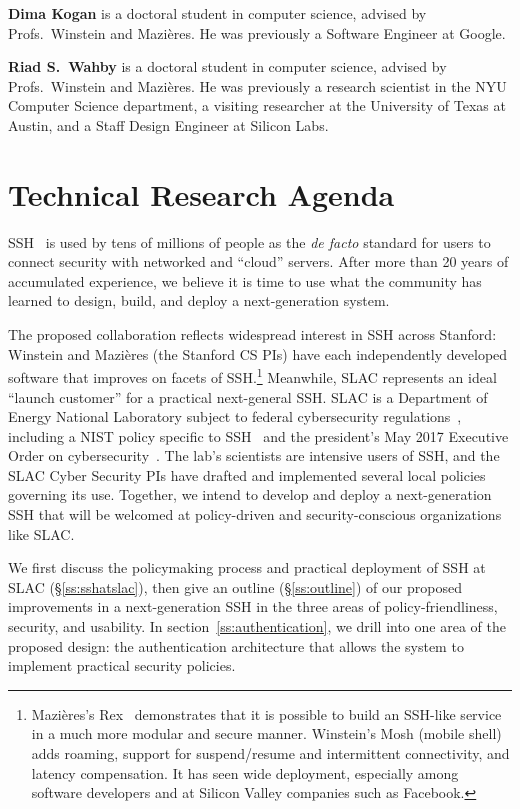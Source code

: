 \documentclass[10pt]{article}
\newcommand{\slim}{\vspace{0.5\baselineskip}}
\begin{document}
\noindent \textbf{Dima Kogan} is a doctoral student in computer science,
advised by Profs.~Winstein and Mazi\`{e}res. He was previously a Software
Engineer at Google.

\slim

\noindent \textbf{Riad S.~Wahby} is a doctoral student in computer science,
advised by Profs.~Winstein and Mazi\`{e}res. He was previously a
research scientist in the NYU Computer Science department, a
visiting researcher at the University of Texas at Austin, and a Staff
Design Engineer at Silicon Labs.

\section{Technical Research Agenda}

SSH~\cite{SSH} is used by tens of millions of people as the \emph{de
  facto} standard for users to connect security with networked and
``cloud'' servers. After more than 20 years of accumulated experience,
we believe it is time to use what the community has
learned to design, build, and deploy a next-generation system.

The proposed collaboration reflects widespread interest in SSH across
Stanford: Winstein and Mazi\`{e}res (the Stanford CS PIs) have each
independently developed software that improves on facets of
SSH.\footnote{Mazi\`{e}res's Rex~\cite{rex} demonstrates that it is
  possible to build an SSH-like service in a much more modular and
  secure manner. Winstein's Mosh (mobile shell)~\cite{Mosh} adds
  roaming, support for suspend/resume and intermittent connectivity,
  and latency compensation. It has seen wide deployment, especially
  among software developers and at Silicon Valley companies such as
  Facebook.} Meanwhile, SLAC represents an ideal ``launch customer''
for a practical next-general SSH. SLAC is a Department of Energy
National Laboratory subject to federal cybersecurity
regulations~\cite{cyberframework, nist80053}, including a NIST policy
specific to SSH~\cite{nistSSH} and the president's May 2017 Executive
Order on cybersecurity~\cite{trumpeo}. The lab's scientists are
intensive users of SSH, and the SLAC Cyber Security PIs have drafted
and implemented several local policies governing its use. Together, we
intend to develop and deploy a next-generation SSH that will be
welcomed at policy-driven and security-conscious organizations like
SLAC.

We first discuss the policymaking process and practical deployment of
SSH at SLAC (\S\ref{ss:sshatslac}), then give an outline
(\S\ref{ss:outline}) of our proposed improvements in a next-generation
SSH in the three areas of policy-friendliness, security, and
usability. In section~\ref{ss:authentication}, we drill into one
area of the proposed design: the authentication architecture that
allows the system to implement practical security policies.
\end{document}
